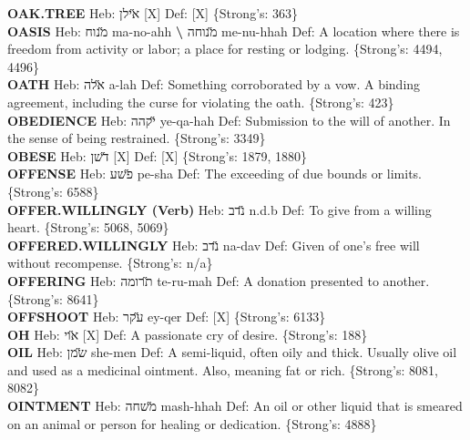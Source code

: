 {\textbf{OAK.TREE} Heb: {\large\H אילן} {[}X{]} Def: {[}X{]} \{Strong's: 363\}\hfill{}\\

\textbf{OASIS} Heb: {\large\H מנוח} ma-no-ahh \textbf{\textbackslash{}} {\large\H מנוחה} me-nu-hhah Def: A location where there is freedom from activity or labor; a place for resting or lodging. \{Strong's: 4494, 4496\}\hfill{}\\

\textbf{OATH} Heb: {\large\H אלה} a-lah Def: Something corroborated by a vow. A binding agreement, including the curse for violating the oath. \{Strong's: 423\}\hfill{}\\

\textbf{OBEDIENCE} Heb: {\large\H יקהה} ye-qa-hah Def: Submission to the will of another. In the sense of being restrained. \{Strong's: 3349\}\hfill{}\\

\textbf{OBESE} Heb: {\large\H דשן} {[}X{]} Def: {[}X{]} \{Strong's: 1879, 1880\}\hfill{}\\

\textbf{OFFENSE} Heb: {\large\H פשע} pe-sha Def: The exceeding of due bounds or limits. \{Strong's: 6588\}\hfill{}\\

\textbf{OFFER.WILLINGLY (Verb)} Heb: {\large\H נדב} n.d.b Def: To give from a willing heart. \{Strong's: 5068, 5069\}\hfill{}\\

\textbf{OFFERED.WILLINGLY} Heb: {\large\H נדב} na-dav Def: Given of one's free will without recompense. \{Strong's: n/a\}\hfill{}\\

\textbf{OFFERING} Heb: {\large\H תרומה} te-ru-mah Def: A donation presented to another. \{Strong's: 8641\}\hfill{}\\

\textbf{OFFSHOOT} Heb: {\large\H עקר} ey-qer Def: {[}X{]} \{Strong's: 6133\}\hfill{}\\

\textbf{OH} Heb: {\large\H אוי} {[}X{]} Def: A passionate cry of desire. \{Strong's: 188\}\hfill{}\\

\textbf{OIL} Heb: {\large\H שמן} she-men Def: A semi-liquid, often oily and thick. Usually olive oil and used as a medicinal ointment. Also, meaning fat or rich. \{Strong's: 8081, 8082\}\hfill{}\\

\textbf{OINTMENT} Heb: {\large\H משחה} mash-hhah Def: An oil or other liquid that is smeared on an animal or person for healing or dedication. \{Strong's: 4888\}\hfill{}\\

}
